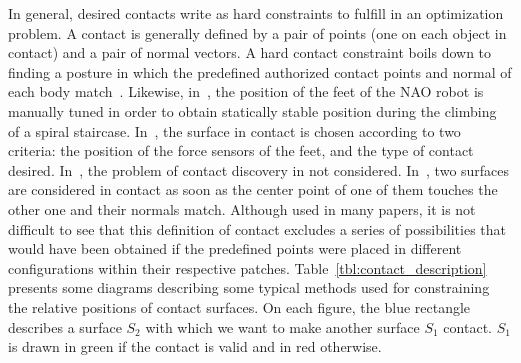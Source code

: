 In general, desired contacts write as hard constraints to fulfill in an optimization problem.
A contact is generally defined by a pair of points (one on each object in contact) and a pair of normal vectors.
A hard contact constraint boils down to finding a posture in which the predefined authorized contact points and normal of each body match~\cite{zhang:TePRA:2013}\cite{hauser:IJRR:2008}.
Likewise, in~\cite{osswald:iros:2011}, the position of the feet of the NAO robot is manually tuned in order to obtain statically stable position during the climbing of a spiral staircase.
In~\cite{Chestnutt:2009:BNR:1733023.1733314}, the surface in contact is chosen according to two criteria: the position of the force sensors of the feet, and the type of contact desired.
In~\cite{sentis:itro:2010}, the problem of contact discovery in not considered.
In~\cite{mordatch:acm:2012}, two surfaces are considered in contact as soon as the center point of one of them touches the other one and their normals match.
Although used in many papers, it is not difficult to see that this definition of contact excludes a series of possibilities that would have been obtained if the predefined points were placed in different configurations within their respective patches.
Table~\ref{tbl:contact_description} presents some diagrams describing some typical methods used for constraining the relative positions of contact surfaces.
On each figure, the blue rectangle describes a surface $S_2$ with which we want to make another surface $S_1$ contact. $S_1$ is drawn in green if the contact is valid and in red otherwise.

